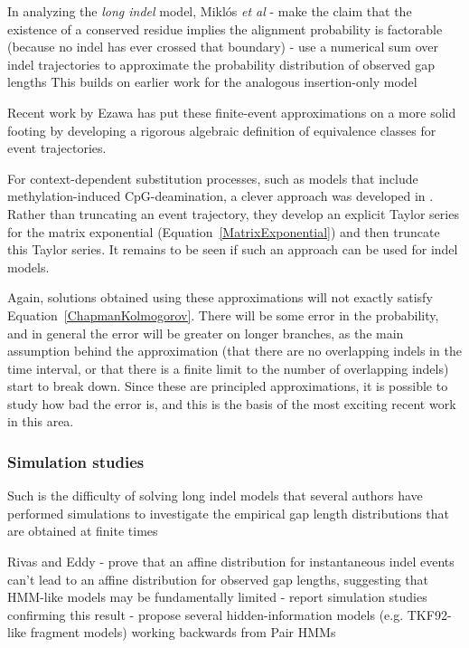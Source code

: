 \documentclass{bmcart}
\newcommand{\eqref}[1]{Equation~\ref{#1}}
\begin{document}
In analyzing the {\em long indel} model, Mikl\'{o}s {\em et al} \cite{MiklosLunterHolmes2004}
 - make the claim that the existence of a conserved residue implies the alignment probability is factorable (because no indel has ever crossed that boundary)
 - use a numerical sum over indel trajectories to approximate the probability distribution of observed gap lengths
This builds on earlier work for the analogous insertion-only model \cite{MiklosEtal2001}

Recent work by Ezawa has put these finite-event approximations on a more solid footing
by developing a rigorous algebraic definition of equivalence classes for event trajectories.

For context-dependent substitution processes,
such as models that include methylation-induced CpG-deamination,
a clever approach was developed in \cite{LunterHein04}.
Rather than truncating an event trajectory, they develop an explicit Taylor series for the matrix exponential
(\eqref{MatrixExponential}) and then truncate this Taylor series.
It remains to be seen if such an approach can be used for indel models.

Again, solutions obtained using these approximations will not exactly satisfy \eqref{ChapmanKolmogorov}.
There will be some error in the probability, and in general the error will be greater
on longer branches, as the main assumption behind the approximation
(that there are no overlapping indels in the time interval, or that there is a finite
limit to the number of overlapping indels)
start to break down.
Since these are principled approximations, it is possible to study
how bad the error is, and this is the basis of the most exciting recent work in this area.

\subsubsection*{Simulation studies}

Such is the difficulty of solving long indel models that several authors have performed simulations
to investigate the empirical gap length distributions that are obtained at finite times

Rivas and Eddy \cite{RivasEddy2015}
 - prove that an affine distribution for instantaneous indel events can't lead to an affine distribution for observed gap lengths, suggesting that HMM-like models may be fundamentally limited
 - report simulation studies confirming this result
 - propose several hidden-information models (e.g. TKF92-like fragment models) working backwards from Pair HMMs
\end{document}
